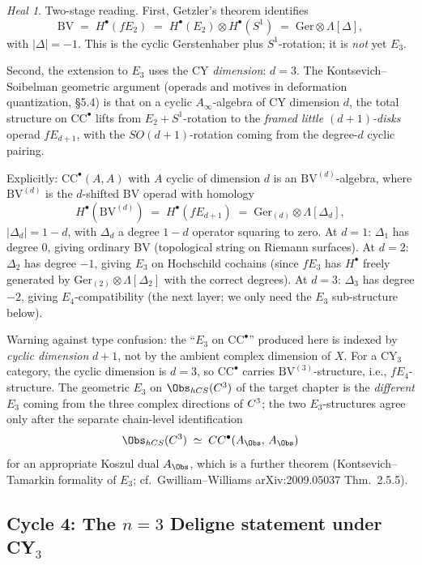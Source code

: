 \documentclass[11pt]{article}
\theoremstyle{definition}
\theoremstyle{remark}
\newtheorem*{heal}{Heal}
\newcommand{\CC}{\mathrm{CC}}
\newcommand{\Ger}{\mathrm{Ger}}
\newcommand{\BV}{\mathrm{BV}}
\newcommand{\Ainf}{A_{\infty}}
\begin{document}
\begin{heal}
Two-stage reading. First, Getzler's theorem identifies
\[
 \BV \;=\; H^\bullet(fE_2) \;=\; H^\bullet(E_2) \otimes H^\bullet(S^1)
 \;=\; \Ger \otimes \Lambda[\Delta],
\]
with $|\Delta| = -1$. This is the cyclic Gerstenhaber plus
$S^1$-rotation; it is \emph{not} yet $E_3$.

Second, the extension to $E_3$ uses the CY \emph{dimension}:
$d = 3$. The Kontsevich--Soibelman geometric argument (operads and
motives in deformation quantization, \S5.4) is that on a cyclic
$\Ainf$-algebra of CY dimension $d$, the total structure on
$\CC^\bullet$ lifts from $E_2 + S^1$-rotation to the
\emph{framed little $(d+1)$-disks} operad $fE_{d+1}$, with the
$SO(d+1)$-rotation coming from the degree-$d$ cyclic pairing.

Explicitly: $\CC^\bullet(A,A)$ with $A$ cyclic of dimension $d$ is an
$\mathrm{BV}^{(d)}$-algebra, where $\mathrm{BV}^{(d)}$ is the
$d$-shifted BV operad with homology
\[
 H^\bullet(\mathrm{BV}^{(d)}) \;=\; H^\bullet(fE_{d+1})
 \;=\; \Ger_{(d)} \otimes \Lambda[\Delta_d],
\]
$|\Delta_d| = 1 - d$, with $\Delta_d$ a degree $1-d$ operator
squaring to zero. At $d = 1$: $\Delta_1$ has degree $0$, giving
ordinary BV (topological string on Riemann surfaces). At $d = 2$:
$\Delta_2$ has degree $-1$, giving $E_3$ on Hochschild cochains
(since $fE_3$ has $H^\bullet$ freely generated by
$\Ger_{(2)} \otimes \Lambda[\Delta_2]$ with the correct degrees). At
$d = 3$: $\Delta_3$ has degree $-2$, giving $E_4$-compatibility
(the next layer; we only need the $E_3$ sub-structure below).

Warning against type confusion: the ``$E_3$ on $\CC^\bullet$'' produced
here is indexed by \emph{cyclic dimension} $d+1$, not by the ambient
complex dimension of $X$. For a CY$_3$ category, the cyclic dimension
is $d = 3$, so $\CC^\bullet$ carries $\mathrm{BV}^{(3)}$-structure,
i.e., $fE_4$-structure. The geometric $E_3$ on $\Obs_{\mathrm{hCS}}
(\C^3)$ of the target chapter is the \emph{different} $E_3$ coming
from the three complex directions of $C^3$; the two $E_3$-structures
agree only after the separate chain-level identification
\[
 \Obs_{\mathrm{hCS}}(\C^3) \;\simeq\; \CC^\bullet(A_{\Obs},\,A_{\Obs})
\]
for an appropriate Koszul dual $A_{\Obs}$, which is a further theorem
(Kontsevich--Tamarkin formality of $E_3$; cf.\ Gwilliam--Williams
arXiv:2009.05037 Thm.~2.5.5).
\end{heal}

\subsection*{Cycle 4: The $n=3$ Deligne statement under CY$_3$}
\end{document}
